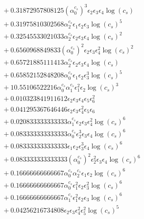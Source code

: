 \documentclass[10pt]{article}
\begin{document}
\begin{align*}
&{}  + 0.31872957808125 \left(\alpha_{0}^{c_s}\right)^{3} \epsilon_{2} \epsilon_{3} \epsilon_{4} \log{\left(c_{s} \right)} \\
&{}  + 0.31975810302568 \alpha_{2}^{c_s} \epsilon_{1} \epsilon_{2} \epsilon_{3} \log{\left(c_{s} \right)}^{5} \\
&{}  + 0.32545533021033 \alpha_{2}^{c_s} \epsilon_{2} \epsilon_{3} \epsilon_{4} \log{\left(c_{s} \right)}^{2} \\
&{}  + 0.6560968849833 \left(\alpha_{0}^{c_s}\right)^{2} \epsilon_{2} \epsilon_{3} \epsilon_{4}^{2} \log{\left(c_{s} \right)}^{2} \\
&{}  + 0.65721885111413 \alpha_{2}^{c_s} \epsilon_{2} \epsilon_{3} \epsilon_{4} \log{\left(c_{s} \right)} \\
&{}  + 0.65852152848208 \alpha_{0}^{c_s} \epsilon_{1} \epsilon_{2} \epsilon_{3}^{3} \log{\left(c_{s} \right)}^{5} \\
&{}  + 10.55106522216 \alpha_{0}^{c_s} \alpha_{1}^{c_s} \epsilon_{1}^{2} \epsilon_{2} \log{\left(c_{s} \right)}^{3} \\
&{}  + 0.010323841911612 \epsilon_{2} \epsilon_{3} \epsilon_{4} \epsilon_{5} \epsilon_{6}^{2} \\
&{}  + 0.041295367646446 \epsilon_{2} \epsilon_{3} \epsilon_{4}^{2} \epsilon_{5} \epsilon_{6} \\
&{}  + 0.020833333333333 \alpha_{1}^{c_s} \epsilon_{2} \epsilon_{3} \epsilon_{4}^{2} \log{\left(c_{s} \right)}^{6} \\
&{}  + 0.083333333333333 \alpha_{0}^{c_s} \epsilon_{2}^{3} \epsilon_{3} \epsilon_{4} \log{\left(c_{s} \right)}^{6} \\
&{}  + 0.083333333333333 \epsilon_{1} \epsilon_{2} \epsilon_{3}^{3} \epsilon_{4} \log{\left(c_{s} \right)}^{6} \\
&{}  + 0.083333333333333 \left(\alpha_{0}^{c_s}\right)^{2} \epsilon_{2}^{2} \epsilon_{3} \epsilon_{4} \log{\left(c_{s} \right)}^{6} \\
&{}  + 0.16666666666667 \alpha_{0}^{c_s} \alpha_{2}^{c_s} \epsilon_{1} \epsilon_{2} \log{\left(c_{s} \right)}^{6} \\
&{}  + 0.16666666666667 \alpha_{0}^{c_s} \epsilon_{1}^{2} \epsilon_{2} \epsilon_{3}^{2} \log{\left(c_{s} \right)}^{6} \\
&{}  + 0.16666666666667 \alpha_{1}^{c_s} \epsilon_{1}^{2} \epsilon_{2} \epsilon_{3} \log{\left(c_{s} \right)}^{6} \\
&{}  + 0.04256216734808 \epsilon_{2} \epsilon_{3} \epsilon_{4}^{2} \epsilon_{5}^{2} \log{\left(c_{s} \right)}^{5} \\

\end{align*}
\end{document}
